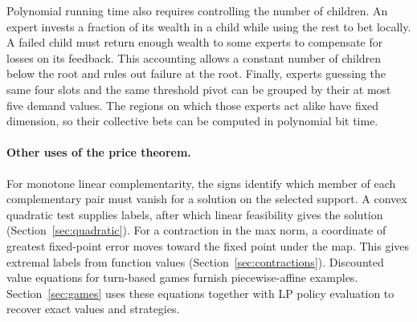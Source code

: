 Polynomial running time also requires controlling the number of
children. An expert invests a fraction of its wealth in a child
while using the rest to bet locally. A failed child must return enough
wealth to some experts to compensate for losses on its feedback.
This accounting allows a constant number of children below the root
and rules out failure at the root. Finally, experts guessing the same
four slots and the same threshold pivot can be grouped by their
at most five demand values. The regions on which those experts act
alike have fixed dimension, so their collective bets can be computed
in polynomial bit time.

\paragraph{Other uses of the price theorem.}
For monotone linear complementarity, the signs identify which member
of each complementary pair must vanish for a solution on the
selected support. A convex quadratic test supplies labels, after
which linear feasibility gives the solution
(Section~\ref{sec:quadratic}). For a contraction in the max norm, a
coordinate of greatest fixed-point error moves toward the fixed
point under the map. This gives extremal labels from function values
(Section~\ref{sec:contractions}). Discounted value equations for
turn-based games furnish piecewise-affine examples. Section~\ref{sec:games}
uses these equations together with LP policy evaluation to recover
exact values and strategies.
